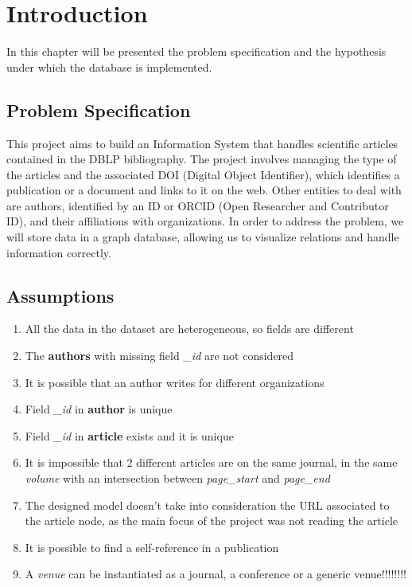 \documentclass{Configuration_Files/PoliMi3i_thesis}
\begin{document}
\mainmatter %

\chapter{Introduction}
\label{ch:introduction}%

In this chapter will be presented the problem specification and the hypothesis under which the database is implemented.

\section{Problem Specification}
\label{sec:prob_specs}
This project aims to build an Information System that handles scientific articles contained in the DBLP
bibliography. The project involves managing the type of the articles and the associated DOI (Digital Object Identifier),
which identifies a publication or a document and links to it on the web. Other entities to deal with are authors, identified by
an ID or ORCID (Open Researcher and Contributor ID), and their affiliations with organizations. In order to address the
problem, we will store data in a graph database, allowing us to visualize relations and handle information correctly.


\section{Assumptions}
\label{sec:assumptions}
\begin{enumerate}
    \item All the data in the dataset are heterogeneous, so fields are different
    \item The \textbf{authors} with missing field \emph{\_id} are not considered
    \item It is possible that an author writes for different organizations
    \item Field \emph{\_id} in \textbf{author} is unique
    \item Field \emph{\_id} in \textbf{article} exists and it is unique
    \item It is impossible that 2 different articles are on the same journal, in the same \emph{volume} with an intersection between \emph{page\_start} and \emph{page\_end}
    \item The designed model doesn't take into consideration the URL associated to the article node, as the main focus of the project was not reading the article
    \item It is possible to find a self-reference in a publication
    \item A \emph{venue} can be instantiated as a journal, a conference or a generic venue!!!!!!!!
\end{enumerate}
\end{document}
